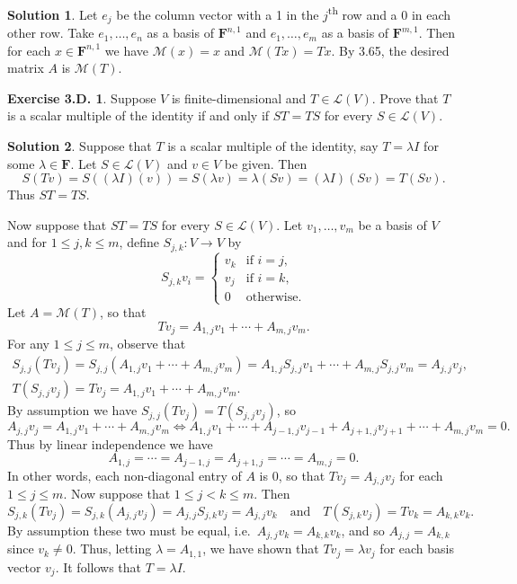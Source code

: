 \documentclass[12pt]{article}
\theoremstyle{definition}
\theoremstyle{exercise}
\newtheorem{exercise}{Exercise 3.D.}
\theoremstyle{solution}
\newtheorem*{solution}{Solution}
\newcommand{\lmap}{\mathcal{L}}
\newcommand{\mat}{\mathcal{M}}
\newcommand{\ts}{\textsuperscript}
\newcommand{\quand}{\quad \text{and} \quad}
\newcommand{\F}{\mathbf{F}}
\begin{document}
\begin{solution}
    Let \( e_j \) be the column vector with a 1 in the \(j\)\ts{th} row and a 0 in each other row. Take \( e_1, \ldots, e_n \) as a basis of \( \F^{n,1} \) and \( e_1, \ldots, e_m \) as a basis of \( \F^{m,1} \). Then for each \( x \in \F^{n,1} \) we have \( \mat(x) = x \) and \( \mat(Tx) = Tx \). By 3.65, the desired matrix \( A \) is \( \mat(T) \).
\end{solution}

\begin{exercise}
\label{ex:16}
    Suppose \( V \) is finite-dimensional and \( T \in \lmap(V) \). Prove that \( T \) is a scalar multiple of the identity if and only if \( ST = TS \) for every \( S \in \lmap(V) \).
\end{exercise}

\begin{solution}
    Suppose that \( T \) is a scalar multiple of the identity, say \( T = \lambda I \) for some \( \lambda \in \F \). Let \( S \in \lmap(V) \) and \( v \in V \) be given. Then
    \[
        S(Tv) = S((\lambda I)(v)) = S(\lambda v) = \lambda (Sv) = (\lambda I)(Sv) = T(Sv).
    \]
    Thus \( ST = TS \).

    Now suppose that \( ST = TS \) for every \( S \in \lmap(V) \). Let \( v_1, \ldots, v_m \) be a basis of \( V \) and for \( 1 \leq j, k \leq m \), define \( S_{j,k} : V \to V \) by
    \[
        S_{j,k} v_i = \begin{cases}
            v_k & \text{if } i = j, \\
            v_j & \text{if } i = k, \\
            0 & \text{otherwise}. 
        \end{cases}
    \]
    Let \( A = \mat(T) \), so that
    \[
        Tv_j = A_{1,j} v_1 + \cdots + A_{m,j} v_m.
    \]
    For any \( 1 \leq j \leq m \), observe that
    \begin{gather*}
        S_{j,j}(Tv_j) = S_{j,j}(A_{1,j} v_1 + \cdots + A_{m,j} v_m) = A_{1,j} S_{j,j}v_1 + \cdots + A_{m,j} S_{j,j}v_m = A_{j,j} v_j, \\[2mm]
        T(S_{j,j}v_j) = Tv_j = A_{1,j} v_1 + \cdots + A_{m,j} v_m.
    \end{gather*}
    By assumption we have \( S_{j,j}(Tv_j) = T(S_{j,j}v_j) \), so
    \[
        A_{j,j} v_j = A_{1,j} v_1 + \cdots + A_{m,j} v_m \iff A_{1,j} v_1 + \cdots + A_{j-1,j} v_{j-1} + A_{j+1,j} v_{j+1} + \cdots + A_{m,j} v_m = 0.
    \]
    Thus by linear independence we have
    \[
        A_{1,j} = \cdots = A_{j-1,j} = A_{j+1,j} = \cdots = A_{m,j} = 0.
    \]
    In other words, each non-diagonal entry of \( A \) is 0, so that \( Tv_j = A_{j,j} v_j \) for each \( 1 \leq j \leq m \). Now suppose that \( 1 \leq j < k \leq m \). Then
    \[
        S_{j,k}(Tv_j) = S_{j,k}(A_{j,j} v_j) = A_{j,j} S_{j,k} v_j = A_{j,j} v_k \quand T(S_{j,k} v_j) = Tv_k = A_{k,k} v_k.
    \]
    By assumption these two must be equal, i.e.\ \( A_{j,j} v_k = A_{k,k} v_k \), and so \( A_{j,j} = A_{k,k} \) since \( v_k \neq 0 \). Thus, letting \( \lambda = A_{1,1} \), we have shown that \( Tv_j = \lambda v_j \) for each basis vector \( v_j \). It follows that \( T = \lambda I \).
\end{solution}
\end{document}
